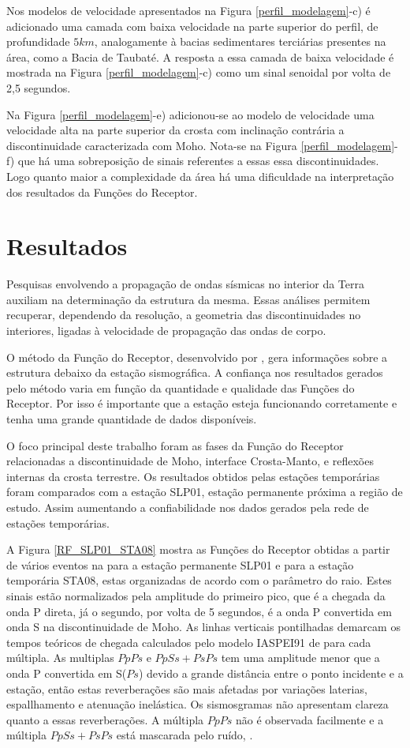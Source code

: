 Nos modelos de velocidade apresentados na Figura \ref{perfil_modelagem}-c) é adicionado uma camada com baixa velocidade na parte superior do perfil, de profundidade $5 km$, analogamente à bacias sedimentares terciárias presentes na área, como a Bacia de Taubaté. A resposta a essa camada de baixa velocidade é mostrada na Figura \ref{perfil_modelagem}-c) como um sinal senoidal por volta de 2,5 segundos.

Na Figura \ref{perfil_modelagem}-e) adicionou-se ao modelo de velocidade uma velocidade alta na parte superior da crosta com inclinação contrária a discontinuidade caracterizada com Moho. Nota-se na Figura \ref{perfil_modelagem}-f) que há uma sobreposição de sinais referentes a essas essa discontinuidades. Logo quanto maior a complexidade da área há uma dificuldade na interpretação dos resultados da Funções do Receptor.

\section{Resultados}

Pesquisas envolvendo a propagação de ondas sísmicas no interior da Terra auxiliam na determinação da estrutura da mesma. Essas análises permitem recuperar, dependendo da resolução, a geometria das discontinuidades no interiores, ligadas à velocidade de propagação das ondas de corpo.  

O método da Função do Receptor, desenvolvido por \cite{Langston_1977}, gera informações sobre a estrutura debaixo da estação sismográfica. A confiança nos resultados gerados pelo método varia em função da quantidade e qualidade das Funções do Receptor. Por isso é importante que a estação esteja funcionando corretamente e tenha uma grande quantidade de dados disponíveis.

O foco principal deste trabalho foram as fases da Função do Receptor relacionadas a discontinuidade de Moho, interface Crosta-Manto, e reflexões internas da crosta terrestre. Os resultados obtidos pelas estações temporárias foram comparados com a estação SLP01, estação permanente próxima a região de estudo. Assim aumentando a confiabilidade nos dados gerados pela rede de estações temporárias.

A Figura \ref{RF_SLP01_STA08} mostra as Funções do Receptor obtidas a partir de vários eventos na para a estação permanente SLP01 e para a estação temporária STA08, estas organizadas de acordo com o parâmetro do raio. Estes sinais estão normalizados pela amplitude do primeiro pico, que é a chegada da onda P direta, já o segundo, por volta de 5 segundos, é a onda P convertida em onda S na discontinuidade de Moho. As linhas verticais pontilhadas demarcam os tempos teóricos de chegada calculados pelo modelo IASPEI91 de \cite{kennet_iaspei_1991} para cada múltipla. As multiplas $PpPs$ e $PpSs+PsPs$ tem uma amplitude menor que a onda P convertida em S($Ps$) devido a grande distância entre o ponto incidente e a estação, então estas reverberações são mais afetadas por variações laterias, espallhamento e atenuação inelástica. Os sismosgramas não apresentam clareza quanto a essas reverberações. A múltipla $PpPs$ não é observada facilmente e a múltipla $PpSs+PsPs$ está mascarada pelo ruído, .

